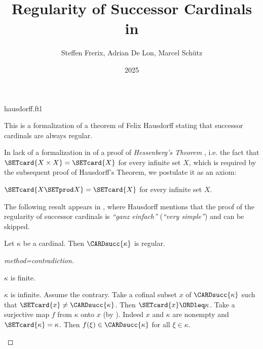 \documentclass{stex}
\title{Regularity of Successor Cardinals in \Naproche}
\author{Steffen Frerix, Adrian De Lon, Marcel Schütz}
\date{2025}
\begin{document}
\begin{smodule}{hausdorff.ftl}
\maketitle


\noindent This is a formalization of a theorem of Felix Hausdorff stating that
successor cardinals are always regular.

In lack of a formalization in \Naproche of a proof of \emph{Hessenberg's
Theorem} \cite{Hessenberg1906}, i.e. the fact that
$\SETcard{X \times X} = \SETcard{X}$ for every
infinite set $X$, which is required by the subsequent
proof of Hausdorff's Theorem, we postulate it as an axiom:

\begin{axiom*}[forthel,title=Hessenberg's Theorem,id=hessenberg]
  $\SETcard{X \SETprod X} = \SETcard{X}$ for every infinite set $X$.
\end{axiom*}

The following result appears in \cite[p.~443]{Hausdorff1908},
where Hausdorff mentions that the proof of the regularity of successor
cardinals is \textit{``ganz einfach''} (\textit{``very simple''})
and can be skipped.

\begin{forthel}
  \begin{theorem*}[title=Hausdorff]
    Let $\kappa$ be a cardinal.
    Then $\CARDsucc{\kappa}$ is regular.
  \end{theorem*}
  \begin{proof}[method=contradiction]
    \begin{case}{$\kappa$ is finite.} \end{case}

    \begin{case}{$\kappa$ is infinite.}
      Assume the contrary.
      Take a cofinal subset $x$ of $\CARDsucc{\kappa}$ such that $\SETcard{x} \neq \CARDsucc{\kappa}$.
      Then $\SETcard{x} \ORDleq \kappa$.
      Take a surjective map $f$ from $\kappa$ onto $x$ (by ).
      Indeed $x$ and $\kappa$ are nonempty and $\SETcard{\kappa} = \kappa$.
      Then $f(\xi) \in \CARDsucc{\kappa}$ for all $\xi \in \kappa$.
  

\end{case}
\end{proof}
\end{forthel}
\end{smodule}
\end{document}
